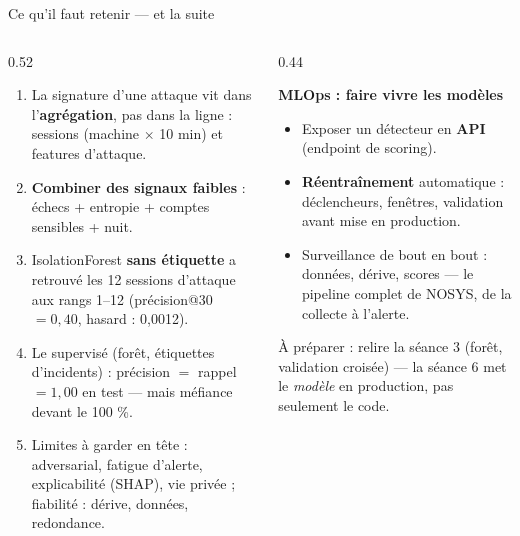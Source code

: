 \begin{frame}{Ce qu'il faut retenir --- et la suite}
\begin{columns}[t]
\begin{column}{0.52\textwidth}
\begin{kbox}
\begin{enumerate}
\item La signature d'une attaque vit dans l'\textbf{agrégation}, pas dans
la ligne : sessions (machine $\times$ 10 min) et features d'attaque.
\item \textbf{Combiner des signaux faibles} : échecs + entropie + comptes
sensibles + nuit.
\item IsolationForest \textbf{sans étiquette} a retrouvé les 12 sessions
d'attaque aux rangs 1--12 (précision@30 $= 0{,}40$, hasard : 0,0012).
\item Le supervisé (forêt, étiquettes d'incidents) : précision $=$ rappel
$= 1{,}00$ en test --- mais méfiance devant le 100 \%.
\item Limites à garder en tête : adversarial, fatigue d'alerte,
explicabilité (SHAP), vie privée ; fiabilité : dérive, données, redondance.
\end{enumerate}
\end{kbox}
\end{column}
\begin{column}{0.44\textwidth}
\begin{ebox}
\textbf{MLOps : faire vivre les modèles}
\begin{itemize}
\item Exposer un détecteur en \textbf{API} (endpoint de scoring).
\item \textbf{Réentraînement} automatique : déclencheurs, fenêtres,
validation avant mise en production.
\item Surveillance de bout en bout : données, dérive, scores --- le
pipeline complet de NOSYS, de la collecte à l'alerte.
\end{itemize}
À préparer : relire la séance 3 (forêt, validation croisée) --- la séance 6
met le \emph{modèle} en production, pas seulement le code.
\end{ebox}
\end{column}
\end{columns}
\end{frame}
